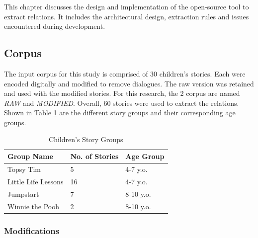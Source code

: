 %
%
%                 

\label{sec:designimplementation}

This chapter discusses the design and implementation of the open-source tool to extract relations. It includes the architectural design, extraction rules and issues encountered during development.

\subsection{Corpus}
\label{sec:corpus}

The input corpus for this study is comprised of 30 children's stories. Each were encoded digitally and modified to remove dialogues. The raw version was retained and used with the modified stories. For this research, the 2 corpus are named \emph{RAW} and \emph{MODIFIED}. Overall, 60 stories were used to extract the relations. Shown in Table \ref{tab:storygroups} are the different story groups and their corresponding age groups. 

\begin{table}[ht]   %
\centering
\caption{Children's Story Groups} \vspace{0.25em}
\begin{tabular}{|p{4cm}|p{2cm}|p{3cm}|} \hline
Group Name & No. of Stories & Age Group \\ \hline
Topsy Tim					& 5 & 4-7 y.o. \\ \hline
Little Life Lessons			& 16 & 4-7 y.o. \\ \hline
Jumpstart					& 7 & 8-10 y.o. \\ \hline
Winnie the Pooh				& 2 & 8-10 y.o. \\ \hline
\end{tabular}
\label{tab:storygroups}
\end{table}

\subsubsection{Modifications}
\label{sec:modifications}

